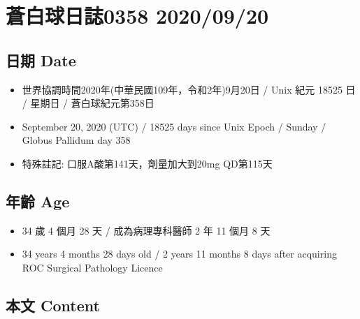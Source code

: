 \documentclass[
]{article}
\providecommand{\tightlist}{%
  \setlength{\itemsep}{0pt}\setlength{\parskip}{0pt}}
\begin{document}
\hypertarget{ux84bcux767dux7403ux65e5ux8a8c0358-20200920}{%
\section{蒼白球日誌0358
2020/09/20}\label{ux84bcux767dux7403ux65e5ux8a8c0358-20200920}}

\hypertarget{ux65e5ux671f-date-19}{%
\subsection{日期 Date}\label{ux65e5ux671f-date-19}}

\begin{itemize}
\tightlist
\item
  世界協調時間2020年(中華民國109年，令和2年)9月20日 / Unix 紀元 18525 日
  / 星期日 / 蒼白球紀元第358日
\item
  September 20, 2020 (UTC) / 18525 days since Unix Epoch / Sunday /
  Globus Pallidum day 358
\item
  特殊註記: 口服A酸第141天，劑量加大到20mg QD第115天
\end{itemize}

\hypertarget{ux5e74ux9f61-age-19}{%
\subsection{年齡 Age}\label{ux5e74ux9f61-age-19}}

\begin{itemize}
\tightlist
\item
  34 歲 4 個月 28 天 / 成為病理專科醫師 2 年 11 個月 8 天
\item
  34 years 4 months 28 days old / 2 years 11 months 8 days after
  acquiring ROC Surgical Pathology Licence
\end{itemize}

\hypertarget{ux672cux6587-content-19}{%
\subsection{本文 Content}\label{ux672cux6587-content-19}}
\end{document}
